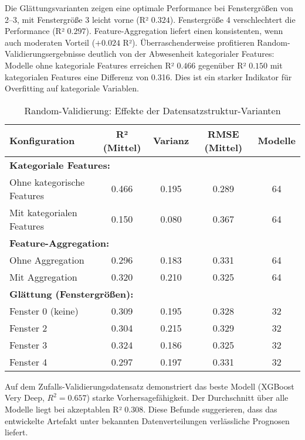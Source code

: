 Die Glättungsvarianten zeigen eine optimale Performance bei Fenstergrößen von 2–3, mit Fenstergröße 3 leicht vorne (R² $0.324$). Fenstergröße 4 verschlechtert die Performance (R² $0.297$). Feature-Aggregation liefert einen konsistenten, wenn auch moderaten Vorteil ($+0.024$ R²). Überraschenderweise profitieren Random-Validierungsergebnisse deutlich von der Abwesenheit kategorialer Features: Modelle ohne kategoriale Features erreichen R² $0.466$ gegenüber R² $0.150$ mit kategorialen Features eine Differenz von 0.316. Dies ist ein starker Indikator für Overfitting auf kategoriale Variablen.

\begin{table}[H]
  \centering
  \begin{tabular}{lcccc}
    \toprule
    \textbf{Konfiguration} & \textbf{R² (Mittel)} & \textbf{Varianz} & \textbf{RMSE (Mittel)} & \textbf{Modelle} \\
    \midrule
    \multicolumn{5}{l}{\textbf{Kategoriale Features:}} \\
    Ohne kategorische Features & 0.466 & 0.195 & 0.289 & 64 \\
    Mit kategorialen Features & 0.150 & 0.080 & 0.367 & 64 \\
    \midrule
    \multicolumn{5}{l}{\textbf{Feature-Aggregation:}} \\
    Ohne Aggregation & 0.296 & 0.183 & 0.331 & 64 \\
    Mit Aggregation & 0.320 & 0.210 & 0.325 & 64 \\
    \midrule
    \multicolumn{5}{l}{\textbf{Glättung (Fenstergrößen):}} \\
    Fenster 0 (keine) & 0.309 & 0.195 & 0.328 & 32 \\
    Fenster 2 & 0.304 & 0.215 & 0.329 & 32 \\
    Fenster 3 & 0.324 & 0.186 & 0.325 & 32 \\
    Fenster 4 & 0.297 & 0.197 & 0.331 & 32 \\
    \bottomrule
  \end{tabular}
  \caption{Random-Validierung: Effekte der Datensatzstruktur-Varianten}
  \label{tab:structure_random}
\end{table}

Auf dem Zufalls-Validierungsdatensatz demonstriert das beste Modell (XGBoost Very Deep, $R^2 = 0.657$) starke Vorhersagefähigkeit. Der Durchschnitt über alle Modelle liegt bei akzeptablen R² $0.308$. Diese Befunde suggerieren, dass das entwickelte Artefakt unter bekannten Datenverteilungen verlässliche Prognosen liefert.


